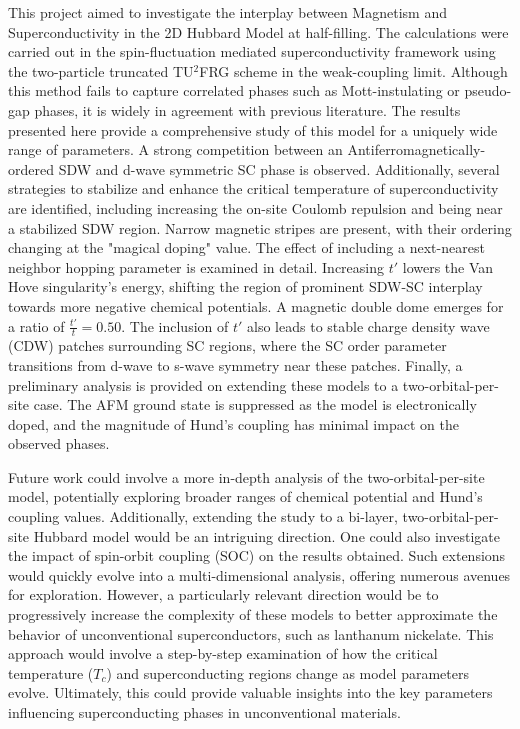 \documentclass[12pt]{article}
\begin{document}
This project aimed to investigate the interplay between Magnetism and Superconductivity in the 2D Hubbard Model at half-filling. The calculations were carried out
in the spin-fluctuation mediated superconductivity framework using the two-particle truncated TU$^2$FRG scheme in the weak-coupling limit. Although this method
fails to capture correlated phases such as Mott-instulating or pseudo-gap phases, it is widely in agreement with previous literature. The results presented here provide
a comprehensive study of this model for a uniquely wide range of parameters. A strong competition between an
Antiferromagnetically-ordered SDW and d-wave symmetric SC phase is observed. 
Additionally, several strategies to stabilize and enhance the critical temperature of superconductivity are identified, including increasing the on-site Coulomb repulsion and being near a stabilized SDW region.
Narrow magnetic stripes are present, with their ordering changing at the "magical doping" value. The effect of including a next-nearest neighbor hopping parameter is examined in detail. Increasing $t'$ lowers the Van Hove singularity's energy, shifting the region of prominent SDW-SC interplay towards more negative chemical potentials.
A magnetic double dome emerges for a ratio of $\frac{t'}{t} = 0.50$.
The inclusion of $t'$ also leads to stable charge density wave (CDW) 
patches surrounding SC regions, where the SC order parameter transitions from d-wave to s-wave symmetry near these patches. 
Finally, a preliminary analysis is provided on extending these models to a 
two-orbital-per-site case. The AFM ground state is suppressed as the model is electronically doped, and the magnitude of Hund's 
coupling has minimal impact on the observed phases.\par


\medskip

\noindent Future work could involve a more in-depth analysis of the two-orbital-per-site model, potentially exploring broader ranges of 
chemical potential and Hund's coupling values. Additionally, extending the study to a bi-layer, two-orbital-per-site Hubbard model would be an intriguing direction. One could also investigate the 
impact of spin-orbit coupling (SOC) on the results obtained. Such extensions would quickly evolve into a multi-dimensional 
analysis, offering numerous avenues for exploration. However, a particularly relevant direction would be to progressively increase
the complexity of these models to better approximate the behavior of unconventional superconductors, 
such as lanthanum nickelate. This approach would involve a step-by-step examination of how the critical temperature ($T_c$) and superconducting 
regions change as model parameters evolve. Ultimately, this could provide valuable insights into the key parameters influencing superconducting 
phases in unconventional materials.




\newpage


\end{document}
